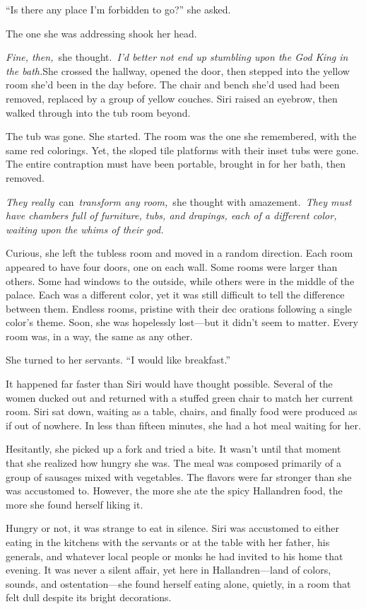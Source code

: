 “Is there any place I’m forbidden to go?” she asked.

The one she was addressing shook her head.

\textit{Fine, then,}~she thought.~\textit{I’d better not end up stumbling upon the God King in the bath.}She crossed the hallway, opened the door, then stepped into the yellow room she’d been in the day before. The chair and bench she’d used had been removed, replaced by a group of yellow couches. Siri raised an eyebrow, then walked through into the tub room beyond.

The tub was gone. She started. The room was the one she remembered, with the same red colorings. Yet, the sloped tile platforms with their inset tubs were gone. The entire contraption must have been portable, brought in for her bath, then removed.

\textit{They really}~can~\textit{transform any room,}~she thought with amazement.~\textit{They must have chambers full of furniture, tubs, and drapings, each of a different color, waiting upon the whims of their god.}

Curious, she left the tubless room and moved in a random direction. Each room appeared to have four doors, one on each wall. Some rooms were larger than others. Some had windows to the outside, while others were in the middle of the palace. Each was a different color, yet it was still difficult to tell the difference between them. Endless rooms, pristine with their dec orations following a single color’s theme. Soon, she was hopelessly lost—but it didn’t seem to matter. Every room was, in a way, the same as any other.

She turned to her servants. “I would like breakfast.”

It happened far faster than Siri would have thought possible. Several of the women ducked out and returned with a stuffed green chair to match her current room. Siri sat down, waiting as a table, chairs, and finally food were produced as if out of nowhere. In less than fifteen minutes, she had a hot meal waiting for her.

Hesitantly, she picked up a fork and tried a bite. It wasn’t until that moment that she realized how hungry she was. The meal was composed primarily of a group of sausages mixed with vegetables. The flavors were far stronger than she was accustomed to. However, the more she ate the spicy Hallandren food, the more she found herself liking it.

Hungry or not, it was strange to eat in silence. Siri was accustomed to either eating in the kitchens with the servants or at the table with her father, his generals, and whatever local people or monks he had invited to his home that evening. It was never a silent affair, yet here in Hallandren—land of colors, sounds, and ostentation—she found herself eating alone, quietly, in a room that felt dull despite its bright decorations.

